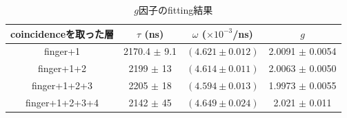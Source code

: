   \begin{table}[H]
   \caption{$g$因子のfitting結果}
   \label{fit_g}
   \begin{center}
    \begin{tabular}{cccc}\toprule
     coincidenceを取った層&$\tau$ (ns)& $\omega$ ($\times 10^{-3}$/ns) & $g$ \\ \midrule
     finger+1             &2170.4 $\pm$ 9.1 & $( 4.621 \pm 0.012 ) $ & 2.0091 $\pm$ 0.0054 \\
     finger+1+2 	  &2199 $\pm$ 13    & $( 4.614 \pm 0.011 ) $ & 2.0063 $\pm$ 0.0050 \\
     finger+1+2+3 	  &2205 $\pm$ 18    & $( 4.594 \pm 0.013 ) $ & 1.9973 $\pm$ 0.0055\\
     finger+1+2+3+4 	  &2142 $\pm$ 45    & $( 4.649 \pm 0.024 ) $ & 2.021 $\pm$ 0.011 \\ \bottomrule
    \end{tabular}
   \end{center}
  \end{table}%


